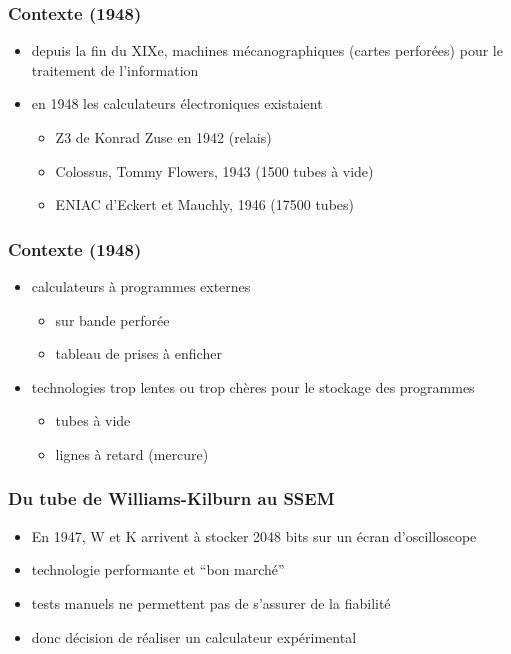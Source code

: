 \documentclass{beamer}
\begin{document}
\begin{frame}
\frametitle{Contexte (1948)}

\begin{itemize}
\item depuis la fin du XIXe, machines mécanographiques (cartes perforées) pour 
le traitement de l'information
\item en 1948 les calculateurs électroniques existaient  
\begin{itemize}
\item
  \alert{Z3} de Konrad Zuse en \alert{1942} (relais)
\item \alert{Colossus}, Tommy Flowers, \alert{1943}  (1500 tubes à vide)
 \item \alert{ENIAC} d'Eckert et Mauchly, \alert{1946} (17500 tubes)
\end{itemize}
\end{itemize}
\end{frame}

\begin{frame}
\frametitle{Contexte (1948)}

\begin{itemize}
\item  calculateurs à \alert{programmes externes}
  \begin{itemize}
    \item sur \alert{bande perforée}
      \item \alert{tableau de prises} à enficher
\end{itemize}
\item technologies \alert{trop lentes} ou \alert{trop chères} pour le stockage des programmes
\begin{itemize}
\item tubes à vide
\item lignes à retard (mercure)
\end{itemize}
\end{itemize}
\end{frame}

\begin{frame}
\frametitle{Du tube de Williams-Kilburn au SSEM}

\begin{itemize}
\item En 1947, W et K arrivent à stocker 2048 bits sur un écran d'oscilloscope
\item technologie performante et ``bon marché''
\item tests manuels ne permettent pas de s'assurer de la fiabilité
\item donc \alert{décision de réaliser un calculateur expérimental}
\end{itemize}
\end{frame}
\end{document}
